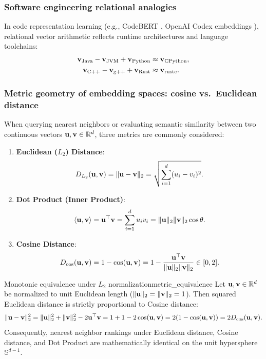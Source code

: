 \documentclass[../../main.tex]{subfiles}
\begin{document}
\subsubsection{Software engineering relational analogies}
In code representation learning (e.g., CodeBERT \cite{feng2020codebert}, OpenAI Codex embeddings \cite{chen2021codex}), relational vector arithmetic reflects runtime architectures and language toolchains:
\begin{align}
\label{eq:se_analogy_runtime}
\mathbf{v}_{\text{Java}} - \mathbf{v}_{\text{JVM}} + \mathbf{v}_{\text{Python}} &\approx \mathbf{v}_{\text{CPython}}, \\
\label{eq:se_analogy_compiler}
\mathbf{v}_{\text{C++}} - \mathbf{v}_{\text{g++}} + \mathbf{v}_{\text{Rust}} &\approx \mathbf{v}_{\text{rustc}}.
\end{align}

\subsubsection{Metric geometry of embedding spaces: cosine vs.~Euclidean distance}
\label{subsec:metric_geometry}

When querying nearest neighbors or evaluating semantic similarity between two continuous vectors $\mathbf{u}, \mathbf{v} \in \mathbb{R}^d$, three metrics are commonly considered:
\begin{enumerate}
    \item \textbf{Euclidean ($L_2$) Distance}:
    \begin{equation}
    \label{eq:euclidean_dist}
    D_{L_2}(\mathbf{u}, \mathbf{v}) = \|\mathbf{u} - \mathbf{v}\|_2 = \sqrt{\sum_{i=1}^d (u_i - v_i)^2}.
    \end{equation}
    \item \textbf{Dot Product (Inner Product)}:
    \begin{equation}
    \label{eq:dot_prod_metric}
    \langle\mathbf{u}, \mathbf{v}\rangle = \mathbf{u}^\top \mathbf{v} = \sum_{i=1}^d u_i v_i = \|\mathbf{u}\|_2 \|\mathbf{v}\|_2 \cos \theta.
    \end{equation}
    \item \textbf{Cosine Distance}:
    \begin{equation}
    \label{eq:cosine_dist_def}
    D_{\cos}(\mathbf{u}, \mathbf{v}) = 1 - \cos(\mathbf{u}, \mathbf{v}) = 1 - \frac{\mathbf{u}^\top \mathbf{v}}{\|\mathbf{u}\|_2 \|\mathbf{v}\|_2} \in [0, 2].
    \end{equation}
\end{enumerate}

\begin{theorem}{Monotonic equivalence under $L_2$ normalization}{metric_equivalence}
Let $\mathbf{u}, \mathbf{v} \in \mathbb{R}^d$ be normalized to unit Euclidean length ($\|\mathbf{u}\|_2 = \|\mathbf{v}\|_2 = 1$). Then squared Euclidean distance is strictly proportional to Cosine distance:
\begin{equation}
\label{eq:unit_norm_equiv}
\|\mathbf{u} - \mathbf{v}\|_2^2 = \|\mathbf{u}\|_2^2 + \|\mathbf{v}\|_2^2 - 2 \mathbf{u}^\top \mathbf{v} = 1 + 1 - 2 \cos(\mathbf{u}, \mathbf{v}) = 2(1 - \cos(\mathbf{u}, \mathbf{v})) = 2 D_{\cos}(\mathbf{u}, \mathbf{v}).
\end{equation}
Consequently, nearest neighbor rankings under Euclidean distance, Cosine distance, and Dot Product are mathematically identical on the unit hypersphere $\mathbb{S}^{d-1}$.
\end{theorem}
\end{document}
